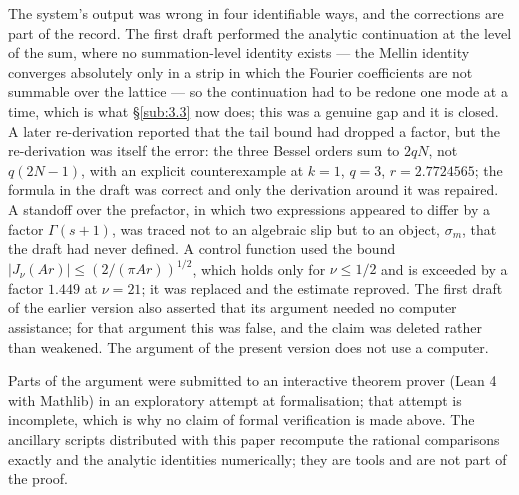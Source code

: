 \documentclass[11pt]{article}
\theoremstyle{plain}
\theoremstyle{definition}
\theoremstyle{remark}
\begin{document}
The system's output was wrong in four identifiable ways, and the corrections are part of the record. The first draft performed the analytic continuation at the level of the sum, where no summation-level identity exists --- the Mellin identity converges absolutely only in a strip in which the Fourier coefficients are not summable over the lattice --- so the continuation had to be redone one mode at a time, which is what \S\ref{sub:3.3} now does; this was a genuine gap and it is closed. A later re-derivation reported that the tail bound had dropped a factor, but the re-derivation was itself the error: the three Bessel orders sum to $2qN$, not $q(2N-1)$, with an explicit counterexample at $k = 1$, $q = 3$, $r = 2.7724565$; the formula in the draft was correct and only the derivation around it was repaired. A standoff over the prefactor, in which two expressions appeared to differ by a factor $\Gamma (s+1)$, was traced not to an algebraic slip but to an object, $\sigma_m$, that the draft had never defined. A control function used the bound $|J_\nu (Ar)| \le (2/(\pi Ar))^{1/2}$, which holds only for $\nu \le 1/2$ and is exceeded by a factor $1.449$ at $\nu = 21$; it was replaced and the estimate reproved. The first draft of the earlier version also asserted that its argument needed no computer assistance; for that argument this was false, and the claim was deleted rather than weakened. The argument of the present version does not use a computer.

Parts of the argument were submitted to an interactive theorem prover (Lean 4 with Mathlib) in an exploratory attempt at formalisation; that attempt is incomplete, which is why no claim of formal verification is made above. The ancillary scripts distributed with this paper recompute the rational comparisons exactly and the analytic identities numerically; they are tools and are not part of the proof.
\end{document}
